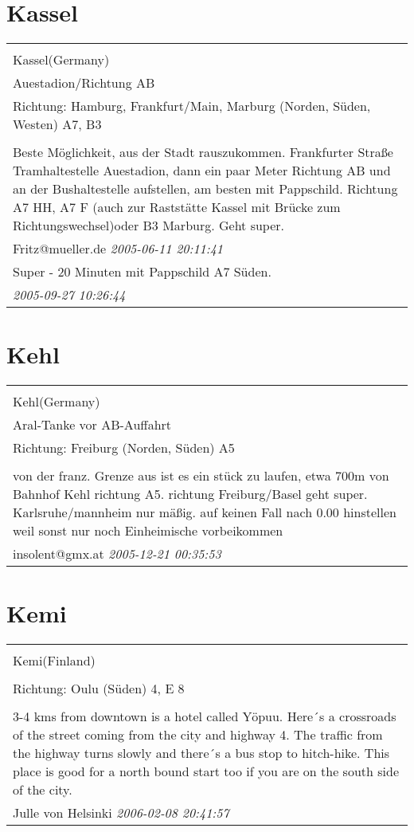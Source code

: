 \documentclass[a4paper,12pt]{article}
\begin{document}
\section{Kassel}
\begin{tabular}{|p{13cm}|}
\hline\\
Kassel(Germany)\\
Auestadion/Richtung AB\\
Richtung: Hamburg, Frankfurt/Main, Marburg (Norden, Süden, Westen) A7, B3 \\
\hline\\
Beste Möglichkeit, aus der Stadt rauszukommen. Frankfurter Straße Tramhaltestelle Auestadion, dann ein paar Meter Richtung AB und an der Bushaltestelle aufstellen, am besten mit Pappschild. Richtung A7 HH, A7 F (auch zur Raststätte Kassel mit Brücke zum Richtungswechsel)oder B3 Marburg. Geht super. \\
Fritz@mueller.de \textit{ 2005-06-11 20:11:41 }\\\hline Super - 20 Minuten mit Pappschild A7 Süden. \\
\textit{ 2005-09-27 10:26:44 }\\\hline
\end{tabular}


\section{Kehl}
\begin{tabular}{|p{13cm}|}
\hline\\
Kehl(Germany)\\
Aral-Tanke vor AB-Auffahrt\\
Richtung: Freiburg (Norden, Süden) A5 \\
\hline\\
von der franz. Grenze aus ist es ein stück zu laufen, etwa 700m von Bahnhof Kehl richtung A5.
richtung Freiburg/Basel geht super. Karlsruhe/mannheim nur mäßig.
auf keinen Fall nach 0.00 hinstellen weil sonst nur noch Einheimische vorbeikommen \\
insolent@gmx.at \textit{ 2005-12-21 00:35:53 }\\\hline
\end{tabular}


\section{Kemi}
\begin{tabular}{|p{13cm}|}
\hline\\
Kemi(Finland)\\
\\
Richtung: Oulu (Süden) 4, E 8 \\
\hline\\
3-4 kms from downtown is a hotel called Yöpuu. Here´s a crossroads of the street coming from the city and highway 4. The traffic from the highway turns slowly and there´s a bus stop to hitch-hike. This place is good for a north bound start too if you are on the south side of the city. \\
Julle von Helsinki \textit{ 2006-02-08 20:41:57 }\\\hline
\end{tabular}
\end{document}
